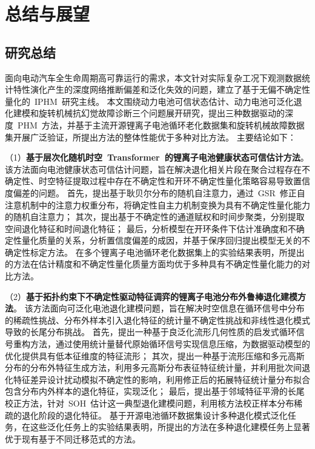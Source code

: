 \chapter{总结与展望}

\section{研究总结}

面向电动汽车全生命周期高可靠运行的需求，本文针对实际复杂工况下观测数据统计特性演化产生的深度网络推断偏差和泛化失效的问题，建立了基于无偏不确定性量化的~IPHM~研究主线。
% 
本文围绕动力电池可信状态估计、动力电池可泛化退化建模和旋转机械抗幻觉故障诊断三个问题展开研究，提出三种数据驱动的深度~PHM~方法，并基于主流开源锂离子电池循环老化数据集和旋转机械故障数据集开展广泛验证，所提出方法的整体性能优于多种对比方法。
主要结论如下：

（1）\textbf{基于层次化随机时空~Transformer~的锂离子电池健康状态可信估计方法}。
该方法面向电池健康状态可信估计问题，旨在解决退化相关片段在聚合过程存在不确定性、时空特征提取过程中存在不确定性和开环不确定性量化策略容易导致置信度偏差的问题。
首先，提出基于耿贝尔分布的随机自注意力，通过~GSR~修正自注意机制中的注意力权重分布，将确定性自主力机制变换为具有不确定性量化能力的随机自注意力；
其次，提出基于不确定性的通道赋权和时间步聚类，分别提取空间退化特征和时间退化特征；
最后，分析模型在开环条件下估计准确度和不确定性量化质量的关系，分析置信度偏差的成因，并基于保序回归提出模型无关的不确定性标定方法。
在多个锂离子电池循环老化数据集上的实验结果表明，所提出的方法在估计精度和不确定性量化质量方面均优于多种具有不确定性量化能力的对比方法。

（2）\textbf{基于拓扑约束下不确定性驱动特征调弈的锂离子电池分布外鲁棒退化建模方法}。
该方法面向可泛化电池退化建模问题，旨在解决时空信息在循环信号中分布的稀疏性挑战、分布外样本引入退化特征的统计量不确定性挑战和非线性退化模式导致的长尾分布挑战。
首先，提出一种基于良泛化流形几何性质的启发式循环信号重构方法，通过使用统计量替代原始循环信号实现信息压缩，为数据驱动模型的优化提供具有低本征维度的特征流形；
其次，提出一种基于流形压缩和多元高斯分布的分布外特征生成方法，利用多元高斯分布表征特征统计量，并利用批次间退化特征差异设计扰动模拟不确定性的影响，利用修正后的拓展特征统计量分布拟合包含分布内外样本的退化特征，实现泛化；
最后，提出基于邻域特征平滑的长尾校正方法，针对~SOH~估计这一典型退化建模问题，利用核方法校正样本分布稀疏的退化阶段的退化特征。
基于开源电池循环数据集设计多种退化模式泛化任务，在这些泛化任务上的实验结果表明，所提出的方法在多种退化建模任务上显著优于现有基于不同迁移范式的方法。

